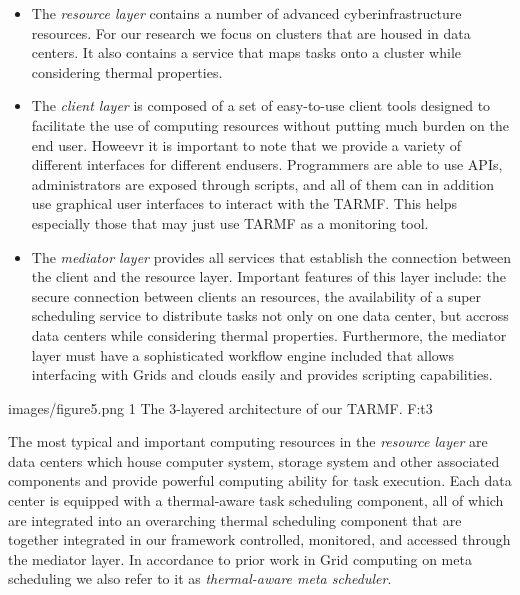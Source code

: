\begin {itemize}
\item The {\em resource layer} contains a number of advanced cyberinfrastructure resources. For our research we focus on clusters that are housed in data centers. It also contains a service that maps tasks onto a cluster while considering thermal properties.

\item The {\em client layer} is composed of a set of easy-to-use client tools designed to facilitate the use of computing resources without putting much burden on the end user. Howeevr it is important to note that we provide a variety of different interfaces for different endusers. Programmers are able to use APIs, administrators are exposed through scripts, and all of them can in addition use graphical user interfaces to interact with the TARMF. This helps especially those that may just use TARMF as a monitoring tool. 

\item The {\em mediator layer} provides all services that establish the connection between the client and the resource layer. Important features of this layer include: the secure connection between clients an resources, the availability of a super scheduling service to distribute tasks not only on one data center, but accross data centers while considering thermal properties. Furthermore, the mediator layer must have a sophisticated workflow engine included that allows interfacing with Grids and clouds easily and provides scripting capabilities.

\end {itemize}

 {images/figure5.png}
 {1}
 {The 3-layered architecture of our TARMF.}
 {F:t3}




The most typical and important computing resources in the {\em resource layer} are data centers which house computer system, storage system and other associated components and provide powerful computing ability for task execution. Each data center is equipped with a thermal-aware task scheduling component, all of which are integrated into an overarching thermal scheduling component that are together integrated in our framework controlled, monitored, and accessed through the mediator layer. In accordance to prior work in Grid computing on meta scheduling \cite{DBLP:conf/mg/HeilgeistSR08} we also refer to it as {\em thermal-aware meta scheduler}.

